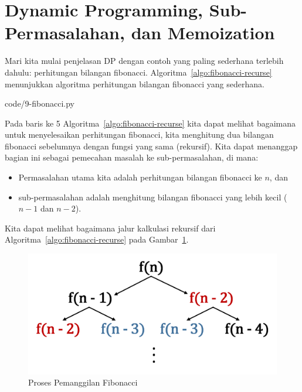 \section{Dynamic Programming, Sub-Permasalahan, dan Memoization}

Mari kita mulai penjelasan DP dengan contoh yang paling sederhana terlebih dahulu: perhitungan bilangan fibonacci. Algoritma~\ref{algo:fibonacci-recurse} menunjukkan algoritma perhitungan bilangan fibonacci yang sederhana.


                {code/9-fibonacci.py}

Pada baris ke 5 Algoritma~\ref{algo:fibonacci-recurse} kita dapat melihat bagaimana untuk menyelesaikan perhitungan fibonacci, kita menghitung dua bilangan fibonacci sebelumnya dengan fungsi yang sama (rekursif). Kita dapat menanggap bagian ini sebagai pemecahan masalah ke sub-permasalahan, di mana:

\begin{itemize}
    \item Permasalahan utama kita adalah perhitungan bilangan fibonacci ke $n$, dan
    \item sub-permasalahan adalah menghitung bilangan fibonacci yang lebih kecil ($n - 1$ dan $n - 2$).
\end{itemize}

Kita dapat melihat bagaimana jalur kalkulasi rekursif dari Algoritma~\ref{algo:fibonacci-recurse} pada Gambar~\ref{fig:fibonacci-recurse}.

\begin{figure}
    \includegraphics[width=\textwidth,keepaspectratio]{fig/FibonacciCallStack.png}%
	\caption{Proses Pemanggilan Fibonacci}%
	\label{fig:fibonacci-recurse}%
\end{figure}

